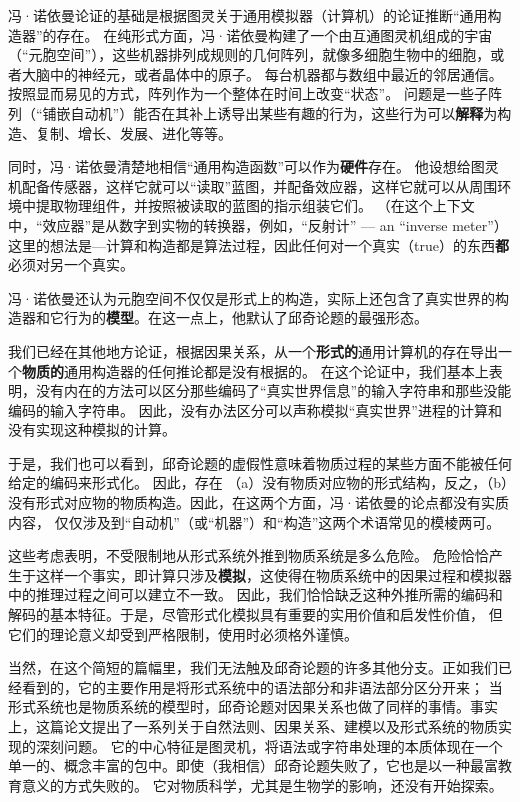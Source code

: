 \documentclass[a4paper,12pt]{article}
\begin{document}
冯·诺依曼论证的基础是根据图灵关于通用\gls{模拟器}（计算机）的论证推断“通用构造器”的存在。
在纯形式方面，冯·诺依曼构建了一个由互通\gls{图灵机}组成的宇宙（“元胞空间”），这些机器排列成规则的几何阵列，就像多细胞生物中的细胞，或者大脑中的神经元，或者晶体中的原子。
每台机器都与数组中最近的邻居通信。按照显而易见的方式，阵列作为一个整体在时间上改变“状态”。
问题是一些子阵列（“铺嵌自动机”）能否在其补上诱导出某些有趣的行为，这些行为可以\textbf{解释}为构造、复制、增长、发展、进化等等。

同时，冯·诺依曼清楚地相信“通用构造函数”可以作为\textbf{\gls{硬件}}存在。
他设想给\gls{图灵机}配备传感器，这样它就可以“读取”蓝图，并配备效应器，这样它就可以从周围环境中提取物理组件，并按照被读取的蓝图的指示组装它们。
（在这个上下文中，“效应器”是从数字到实物的\gls{转换器}，例如，“反射计” — an “inverse meter”）
这里的想法是—计算和构造都是\gls{算法过程}，因此任何对一个真实（true）的东西\textbf{都}必须对另一个真实。

冯·诺依曼还认为元胞空间不仅仅是形式上的构造，实际上还包含了真实世界的构造器和它行为的\textbf{\gls{模型}}。在这一点上，他默认了\gls{邱奇论题}的最强形态。

我们已经在其他地方\cite{RosenR1985}论证，根据\gls{因果关系}，从一个\textbf{形式的}通用计算机的存在导出一个\textbf{\gls{物质}的}通用构造器的任何推论都是没有根据的。
在这个论证中，我们基本上表明，没有内在的方法可以区分那些\gls{编码}了“真实世界信息”的输入字符串和那些没能\gls{编码}的输入字符串。
因此，没有办法区分可以声称\gls{模拟}“真实世界”进程的计算和没有实现这种\gls{模拟}的计算。

于是，我们也可以看到，\gls{邱奇论题}的虚假性意味着\gls{物质}过程的某些方面不能被任何给定的\gls{编码}来\gls{形式化}。
因此，存在 （a）没有\gls{物质}对应物的\gls{形式结构}，反之，（b）没有形式对应物的\gls{物质构造}。因此，在这两个方面，冯·诺依曼的论点都没有实质内容，
仅仅涉及到“自动机”（或“机器”）和“构造”这两个术语常见的模棱两可。

这些考虑表明，不受限制地从\gls{形式系统}外推到\gls{物质系统}是多么危险。
危险恰恰产生于这样一个事实，即计算只涉及\textbf{\gls{模拟}}，这使得在\gls{物质系统}中的\gls{因果过程}和\gls{模拟器}中的\gls{推理过程}之间可以建立不一致。
因此，我们恰恰缺乏这种外推所需的\gls{编码}和\gls{解码}的基本特征。于是，尽管\gls{形式化}\gls{模拟}具有重要的实用价值和启发性价值，
但它们的理论意义却受到严格限制，使用时必须格外谨慎。

当然，在这个简短的篇幅里，我们无法触及邱奇论题的许多其他分支。正如我们已经看到的，它的主要作用是将\gls{形式系统}中的\gls{语法}部分和非语法部分区分开来；
当\gls{形式系统}也是\gls{物质系统}的\gls{模型}时，\gls{邱奇论题}对\gls{因果关系}也做了同样的事情。事实上，这篇论文提出了一系列关于\gls{自然法则}、\gls{因果关系}、建模以及\gls{形式系统}的\gls{物质}实现的深刻问题。
它的中心特征是\gls{图灵机}，将\gls{语法}或\gls{字符串处理}的本质体现在一个单一的、概念丰富的包中。即使（我相信）\gls{邱奇论题}失败了，它也是以一种最富教育意义的方式失败的。
它对\gls{物质科学}，尤其是生物学的影响，还没有开始探索。
\end{document}
